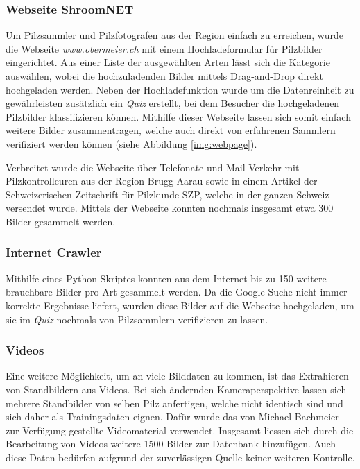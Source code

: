 \subsubsection{Webseite ShroomNET}
Um Pilzsammler und Pilzfotografen aus der Region einfach zu erreichen, wurde die Webseite \textit{www.obermeier.ch} mit einem Hochladeformular für Pilzbilder eingerichtet. Aus einer Liste der ausgewählten Arten lässt sich die Kategorie auswählen, wobei die hochzuladenden Bilder mittels Drag-and-Drop direkt hochgeladen werden. Neben der Hochladefunktion wurde um die Datenreinheit zu gewährleisten zusätzlich ein \textit{Quiz} erstellt, bei dem Besucher die hochgeladenen Pilzbilder klassifizieren können. Mithilfe dieser Webseite lassen sich somit einfach weitere Bilder zusammentragen, welche auch direkt von erfahrenen Sammlern verifiziert werden können (siehe Abbildung \ref{img:webpage}).

Verbreitet wurde die Webseite über Telefonate und Mail-Verkehr mit Pilzkontrolleuren aus der Region Brugg-Aarau sowie in einem Artikel der Schweizerischen Zeitschrift für Pilzkunde SZP\cite{szp}, welche in der ganzen Schweiz versendet wurde. Mittels der Webseite konnten nochmals insgesamt etwa 300 Bilder gesammelt werden.

\subsubsection{Internet Crawler}
Mithilfe eines Python-Skriptes\cite{crawler} konnten aus dem Internet bis zu 150 weitere brauchbare Bilder pro Art gesammelt werden. Da die Google-Suche nicht immer korrekte Ergebnisse liefert, wurden diese Bilder auf die Webseite hochgeladen, um sie im \textit{Quiz} nochmals von Pilzsammlern verifizieren zu lassen. 

\subsubsection{Videos}
Eine weitere Möglichkeit, um an viele Bilddaten zu kommen, ist das Extrahieren von Standbildern aus Videos. Bei sich ändernden Kameraperspektive lassen sich mehrere Standbilder von selben Pilz anfertigen, welche nicht identisch sind und sich daher als Trainingsdaten eignen. Dafür wurde das von Michael Bachmeier\cite{bachmeier} zur Verfügung gestellte Videomaterial verwendet. Insgesamt liessen sich durch die Bearbeitung von Videos weitere 1500 Bilder zur Datenbank hinzufügen. Auch diese Daten bedürfen aufgrund der zuverlässigen Quelle keiner weiteren Kontrolle.


